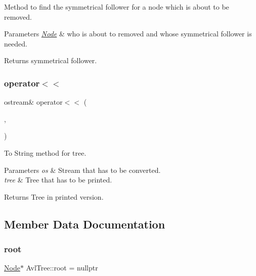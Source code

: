 Method to find the symmetrical follower for a node which is about to be removed. 
\begin{DoxyParams}{Parameters}
{\em \mbox{\hyperlink{struct_avl_tree_1_1_node}{Node}}} & who is about to removed and whose symmetrical follower is needed. \\
\hline
\end{DoxyParams}
\begin{DoxyReturn}{Returns}
symmetrical follower. 
\end{DoxyReturn}
\mbox{\label{class_avl_tree_ac676efc95b21ee681709baf45542c3a7}} 
\subsubsection{\texorpdfstring{operator$<$$<$}{operator<<}}
{\footnotesize\ttfamily ostream\& operator$<$$<$ (\begin{DoxyParamCaption}\item[{ostream \&}]{,  }\item[{const \mbox{\hyperlink{class_avl_tree}{Avl\+Tree}} \&}]{ }\end{DoxyParamCaption})\hspace{0.3cm}{\ttfamily [friend]}}

To String method for tree. 
\begin{DoxyParams}{Parameters}
{\em os} & Stream that has to be converted. \\
\hline
{\em tree} & Tree that has to be printed. \\
\hline
\end{DoxyParams}
\begin{DoxyReturn}{Returns}
Tree in printed version. 
\end{DoxyReturn}


\subsection{Member Data Documentation}
\mbox{\label{class_avl_tree_af08fafc721fec1c59bbade05b9115ebf}} 
\subsubsection{\texorpdfstring{root}{root}}
{\footnotesize\ttfamily \mbox{\hyperlink{struct_avl_tree_1_1_node}{Node}}$\ast$ Avl\+Tree\+::root = nullptr\hspace{0.3cm}{\ttfamily [private]}}

